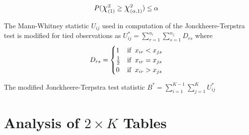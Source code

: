 \documentclass[12pt,oneside]{report}
\theoremstyle{definition}
\theoremstyle{mystyle}
\begin{document}
\begin{equation*}
P(\mbox{\Large$\chi$}^{2}_{(1)}\geq \mbox{\Large$\chi$}^{2}_{(\alpha,1)}) \leq \alpha
\end{equation*}


The Mann-Whitney statistic $U_{ij}$ used in computation of the Jonckheere-Terpstra test is modified for tied observations as $U^{*}_{ij}=\sum\limits_{r=1}^{n_{i}}\sum\limits_{s=1}^{n_{j}}D_{rs}$ where \\

\[ D_{rs}=\begin{cases}
1 & \mbox{if} \hspace{2mm} x_{ir}<x_{js}  \\
\frac{1}{2} & \mbox{if}\hspace{2mm} x_{ir}=x_{js} \\
0 & \mbox{if}\hspace{2mm} x_{ir}>x_{js}\\
\end{cases}
\]

The modified Jonckheere-Terpstra test statistic $B^{*}=\sum\limits_{i=1}^{K-1}\sum\limits_{j=1}^{K}U_{ij}^{*}$





\section{Analysis of  $2\times K$ Tables}
\end{document}
